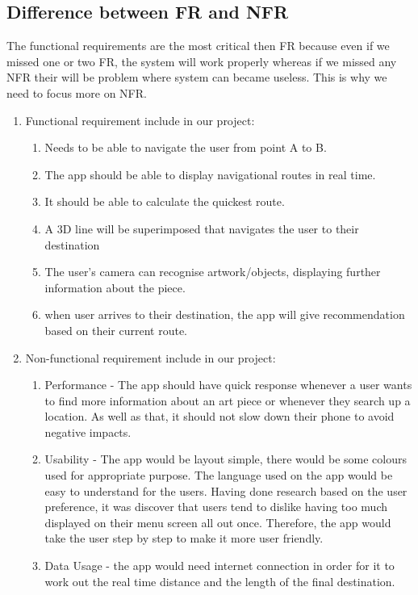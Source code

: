 \subsection{Difference between FR and NFR}
The functional requirements are the most critical then FR because even if we missed one or two FR, the system will work properly whereas if we missed any NFR their will be problem where system can became useless. This is why we need to focus more on NFR.
\begin{enumerate}
    \item Functional requirement include in our project:
    \begin{enumerate}
        \item Needs to be able to navigate the user from point A to B.
        \item The app should be able to display navigational routes in real time.
        \item It should be able to calculate the quickest route.
        \item A 3D line will be superimposed that navigates the user to their destination
        \item The user’s camera can recognise artwork/objects, displaying further information about the piece.
        \item when user arrives to their destination, the app will give recommendation based on their current route.
    \end{enumerate}
    \item Non-functional requirement include in our project:
    \begin{enumerate}
        \item Performance -  The app should have quick response whenever a user wants to find more information about an art piece or whenever they search up a location. As well as that, it should not slow down their phone to avoid negative impacts.
        \item Usability - The app would be layout simple, there would be some colours used for appropriate purpose. The language used on the app would be easy to understand for the users. Having done research based on the user preference, it was discover that users tend to dislike having too much displayed on their menu screen all out once. Therefore, the app would take the user step by step to make it more user friendly.
        \item Data Usage - the app would need internet connection in order for it to work out the real time distance and the length of the final destination.
    \end{enumerate}
\end{enumerate}

